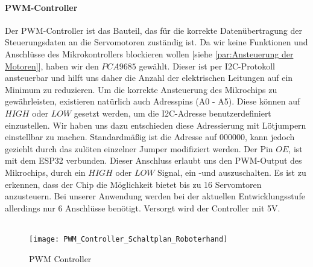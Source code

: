 \documentclass[titlepage,12pt,twoside]{article}
\begin{document}
\paragraph{PWM-Controller}
\hfill \break
\hfill \break
Der PWM-Controller ist das Bauteil, das für die korrekte Datenübertragung der Steuerungsdaten an die Servomotoren zuständig ist. Da wir keine Funktionen und Anschlüsse des Mikrokontrollers blockieren wollen [siehe \textcolor{blue}{\autoref{par:Ansteuerung der Motoren}}], 
haben wir den $PCA9685$ gewählt. Dieser ist per I2C-Protokoll ansteuerbar und hilft uns daher die Anzahl der elektrischen Leitungen auf ein Minimum zu reduzieren. Um die korrekte Ansteuerung des Mikrochips zu gewährleisten, existieren
natürlich auch Adresspins (A0 - A5). Diese können auf $HIGH$ oder $LOW$ gesetzt werden, um die I2C-Adresse benutzerdefiniert einzustellen. Wir haben uns dazu entschieden diese Adressierung mit Lötjumpern einstellbar zu machen. Standardmäßig
ist die Adresse auf $0 0 0 0 0 0$, kann jedoch geziehlt durch das zulöten einzelner Jumper modifiziert werden. Der Pin $OE$, ist mit dem ESP32 verbunden. Dieser Anschluss erlaubt uns den PWM-Output des Mikrochips, durch ein $HIGH$ oder $LOW$ 
Signal, ein -und auszuschalten. Es ist zu erkennen, dass der Chip die Möglichkeit bietet bis zu 16 Servomtoren anzusteuern. Bei unserer Anwendung werden bei der aktuellen Entwicklungsstufe allerdings nur 6 Anschlüsse benötigt. Versorgt wird
der Controller mit 5V. \\
\\
\begin{figure}[H]
	\begin{center}
		\scalebox{0.6}
		{\texttt{[image: PWM\_Controller\_Schaltplan\_Roboterhand]}}
		\caption{PWM Controller}
		\label{fig:PWM_Controller_Schaltplan_Roboterhand}		
	\end{center}
\end{figure}
\hfill \break
\newpage
\end{document}

